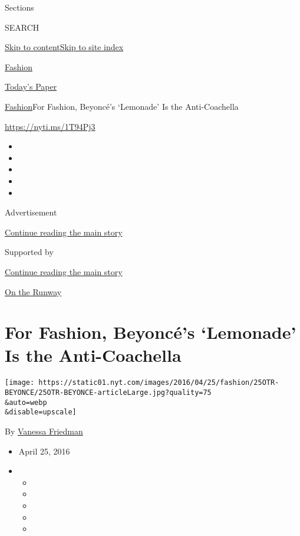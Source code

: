 Sections

SEARCH

\protect\hyperlink{site-content}{Skip to
content}\protect\hyperlink{site-index}{Skip to site index}

\href{https://www.nytimes.com/section/fashion}{Fashion}

\href{https://myaccount.nytimes.com/auth/login?response_type=cookie\&client_id=vi}{}

\href{https://www.nytimes.com/section/todayspaper}{Today's Paper}

\href{/section/fashion}{Fashion}\textbar{}For Fashion, Beyoncé's
`Lemonade' Is the Anti-Coachella

\url{https://nyti.ms/1T94Pj3}

\begin{itemize}
\item
\item
\item
\item
\item
\end{itemize}

Advertisement

\protect\hyperlink{after-top}{Continue reading the main story}

Supported by

\protect\hyperlink{after-sponsor}{Continue reading the main story}

\href{/column/on-the-runway}{On the Runway}

\hypertarget{for-fashion-beyoncuxe9s-lemonade-is-the-anti-coachella}{%
\section{For Fashion, Beyoncé's `Lemonade' Is the
Anti-Coachella}\label{for-fashion-beyoncuxe9s-lemonade-is-the-anti-coachella}}

\texttt{[image: https://static01.nyt.com/images/2016/04/25/fashion/25OTR-BEYONCE/25OTR-BEYONCE-articleLarge.jpg?quality=75\\\&auto=webp\\\&disable=upscale]}

By \href{https://www.nytimes.com/by/vanessa-friedman}{Vanessa Friedman}

\begin{itemize}
\item
  April 25, 2016
\item
  \begin{itemize}
  \item
  \item
  \item
  \item
  \item
  \end{itemize}
\end{itemize}

